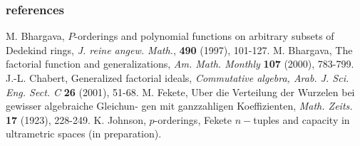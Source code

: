 \documentclass{beamer}
\theoremstyle{definition}
\begin{document}
\begin{frame}
\frametitle{references}
\begin{thebibliography}{9}
	 M. Bhargava, $P$-orderings and polynomial functions on arbitrary subsets of Dedekind
	rings, \textit{J. reine angew. Math.}, \textbf{490} (1997), 101-127.
	 M. Bhargava, The factorial function and generalizations, \textit{Am. Math. Monthly}
	\textbf{107} (2000), 783-799.
	 J.-L. Chabert, Generalized factorial ideals, \textit{Commutative algebra, Arab. J. Sci. Eng.
		Sect. C} \textbf{26} (2001), 51-68.
	 M. Fekete, Uber die Verteilung der Wurzelen bei gewisser algebraiche Gleichun-
	gen mit ganzzahligen Koeffizienten, \textit{Math. Zeits.} \textbf{17} (1923), 228-249.
	 K. Johnson, $p$-orderings, Fekete $n-$tuples and capacity in ultrametric spaces (in preparation).
\end{thebibliography}\end{frame}
\end{document}

